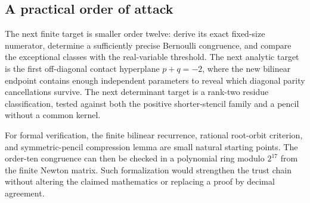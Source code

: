 \subsection{A practical order of attack}

The next finite target is smaller order twelve: derive its exact
fixed-size numerator, determine a sufficiently precise Bernoulli
congruence, and compare the exceptional classes with the real-variable
threshold. The next analytic target is the first off-diagonal contact
hyperplane $p+q=-2$, where the new bilinear endpoint contains enough
independent parameters to reveal which diagonal parity cancellations
survive. The next determinant target is a rank-two residue
classification, tested against both the positive shorter-stencil
family and a pencil without a common kernel.

For formal verification, the finite bilinear recurrence, rational
root-orbit criterion, and symmetric-pencil compression lemma are
small natural starting points. The order-ten congruence can then be
checked in a polynomial ring modulo $2^{17}$ from the finite Newton
matrix. Such formalization would strengthen the trust chain without
altering the claimed mathematics or replacing a proof by decimal
agreement.
